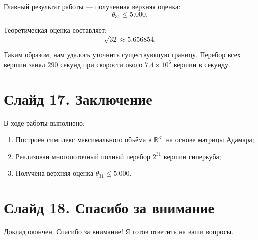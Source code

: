 \documentclass[a4paper,12pt]{article}
\begin{document}
Главный результат работы — полученная верхняя оценка:
\[
\boxed{\theta_{31} \le 5.000}.
\]

Теоретическая оценка составляет:
\[
\sqrt{32} \approx 5.656854.
\]

Таким образом, нам удалось уточнить существующую границу. Перебор всех вершин занял $290$ секунд при скорости около $7.4 \times 10^6$ вершин в секунду.

\section*{Слайд 17. Заключение}

В ходе работы выполнено:
\begin{enumerate}
    \item Построен симплекс максимального объёма в $\mathbb{R}^{31}$ на основе матрицы Адамара;
    \item Реализован многопоточный полный перебор $2^{31}$ вершин гиперкуба;
    \item Получена верхняя оценка $\theta_{31} \le 5.000$.
\end{enumerate}

\section*{Слайд 18. Спасибо за внимание}

Доклад окончен. Спасибо за внимание! Я готов ответить на ваши вопросы.
\end{document}
